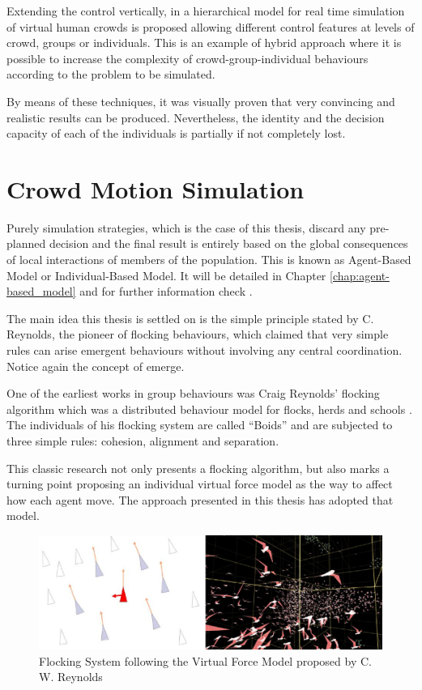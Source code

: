 Extending the control vertically, in \citep{musse2} a hierarchical model for real time simulation of virtual human crowds is proposed allowing different control features at levels of crowd, groups or individuals. This is an example of hybrid approach where it is possible to increase the complexity of crowd-group-individual behaviours according to the problem to be simulated.

By means of these techniques, it was visually proven that very convincing and realistic results can be produced. Nevertheless, the identity and the decision capacity of each of the individuals is partially if not completely lost.

\section{Crowd Motion Simulation}

Purely simulation strategies, which is the case of this thesis, discard any pre-planned decision and the final result is entirely based on the global consequences of local interactions of members of the population. This is known as Agent-Based Model or Individual-Based Model. It will be detailed in Chapter \ref{chap:agent-based_model} and for further information check  \citep{red3D}.

The main idea this thesis is settled on is the simple principle stated by C. Reynolds, the pioneer of flocking behaviours, which claimed that very simple rules can arise emergent behaviours without involving any central coordination. Notice again the concept of emerge.

One of the earliest works  in group behaviours was Craig Reynolds' flocking algorithm which was a distributed behaviour model for flocks, herds and schools \citep{reynolds}. The individuals of his flocking system are called ``Boids'' and are subjected to three simple rules: cohesion, alignment and separation.

This classic research not only presents a flocking algorithm, but also marks a turning point proposing an individual virtual force model as the way to affect how each agent move. The approach presented in this thesis has adopted that model.

\begin{figure}[!htb]
  \centering
  \includegraphics[scale=0.65]{reynolds_flocking.eps}
  \caption[Flocking System]{Flocking System following the Virtual Force Model proposed by C. W. Reynolds \citep{reynolds}}
  \label{fig:massive}
\end{figure}


